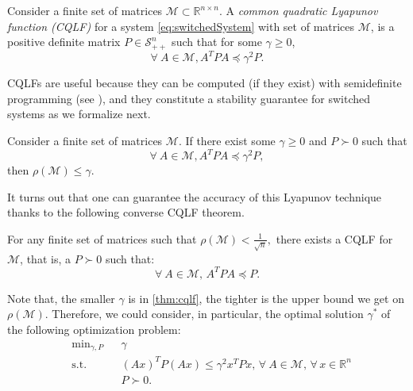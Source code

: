 \begin{defn}
Consider a finite set of matrices $\mathcal{M} \subset \mathbb{R}^{n \times n}$. A \emph{common quadratic Lyapunov function (CQLF)} for a system \eqref{eq:switchedSystem} with set of matrices $\mathcal{M}$, is a positive definite matrix $P \in \mathcal{S}_{++}^n$ such that for some $\gamma \geq 0$, $$\forall\ A \in \mathcal{M}, A^T P A \preceq \gamma^2P.$$
\end{defn}
CQLFs are useful because they can be computed (if they exist) with semidefinite programming (see \cite{boyd}), and they constitute a stability guarantee for switched systems as we formalize next.

\begin{thm}\cite[Prop. 2.8]{jungers_lncis}\label{thm:cqlf} 
Consider a finite set of matrices $\mathcal{M}$. If there exist some $\gamma \geq 0$ and $P \succ 0$ such that $$\forall\ A \in \mathcal{M}, A^T P A \preceq \gamma^2 P,$$ then $\rho(\mathcal{M}) \leq \gamma$.
\end{thm}

It turns out that one can guarantee the accuracy of this Lyapunov technique thanks to the following converse CQLF theorem.

\begin{thm}\cite[Theorem 2.11]{jungers_lncis}\label{thm:john}
For any finite set of matrices such that $\rho(\mathcal{M}) < \frac{1}{\sqrt{n}},$ there exists a CQLF for $\mathcal{M}$, that is, a $P \succ 0$ such that: $$\forall\ A\in \mathcal{M},\, A^T P A \preceq P. $$
\end{thm}

Note that, the smaller $\gamma$ is in \ref{thm:cqlf}, the tighter is the upper bound we get on $\rho(\mathcal{M})$. Therefore, we could consider, in particular, the optimal solution $\gamma^*$ of the following optimization problem:
\begin{equation}\label{eqn:campiOpt0}
\begin{aligned}
& \text{min}_{\gamma, P} & & \gamma\\
& \text{s.t.} 
&  & (Ax)^T P(Ax) \leq \gamma^2 x^T P x,\,\forall\ A \in \mathcal{M}, \,\forall\, x \in \mathbb{R}^n\\
& && P \succ 0. \\
\end{aligned}
\end{equation}

